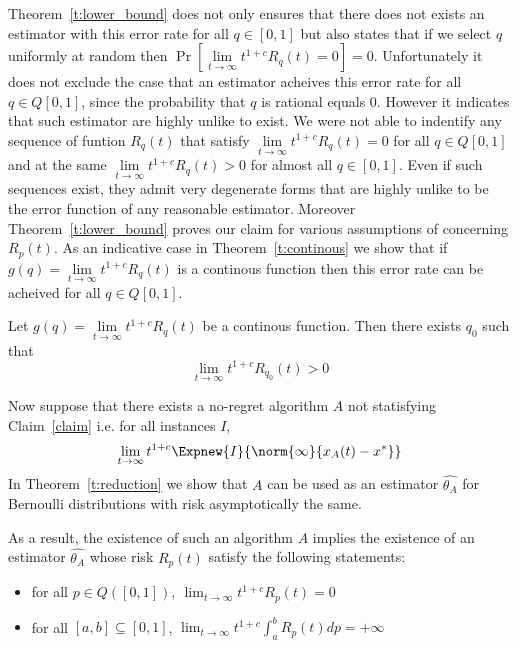 Theorem~\ref{t:lower_bound} does not only ensures that there does not exists an estimator with this 
error rate for all $q \in [0,1]$ but also states that if we select $q$ uniformly at random 
then $\Pr[\lim \limits_{t\to \infty} t^{1+c}R_{q}(t) = 0]=0$. Unfortunately it does not exclude the case
that an estimator acheives this error rate for all $q \in Q[0,1]$, since the probability that
$q$ is rational equals $0$. However it indicates that such estimator are highly unlike to exist.
We were not able to indentify any sequence of funtion $R_q(t)$ that satisfy 
$\lim \limits_{t \to \infty} t^{1+c}R_q(t)=0$ for all $q \in Q[0,1]$ and at the same $\lim \limits_{t \to \infty} t^{1+c}R_q(t)>0$ 
for almost all $q \in [0,1]$. Even if such sequences exist, they admit very degenerate forms that 
are highly unlike to be the error function of any reasonable estimator. Moreover Theorem~\ref{t:lower_bound} proves our
claim for various assumptions of concerning $R_p(t)$. As an indicative case in Theorem~\ref{t:continous} we show that if 
$g(q) = \lim \limits_{t \to \infty} t^{1+c}R_q(t)$ is a continous function then this error rate can be acheived for all 
$q \in Q[0,1]$.

\begin{theorem}\label{t:continous}
Let $g(q) = \lim \limits_{t \to \infty} t^{1+c}R_q(t)$ be a continous function. Then there exists $q_0$ such that
\[\lim \limits_{t \to \infty} t^{1+c}R_{q_0}(t) >0 \]
\end{theorem}




\noindent Now suppose that there exists a no-regret algorithm $A$ not statisfying Claim~\ref{claim} i.e. for all instances $I$, \[\lim_{t\rightarrow \infty}t^{1+c}\Expnew{I}{\norm{\infty}{x_A(t)-x^*}}\]
In Theorem~\ref{t:reduction} we show that $A$ can be used as an estimator $\hat{\theta_A}$ for Bernoulli distributions with risk asymptotically the same.


\noindent As a result, the existence of such an algorithm $A$ implies the existence of an estimator $\hat{\theta_A}$
whose risk $R_p(t)$ satisfy the following statements:

\begin{itemize}
 \item for all $p \in Q([0,1]),~ \lim_{t \rightarrow \infty}t^{1+c}R_p(t)=0$
 \item for all $[a,b] \subseteq [0,1]$, $\lim_{t \to \infty}t^{1+c} \int_{a}^{b}R_p(t)dp = +\infty$
\end{itemize}



